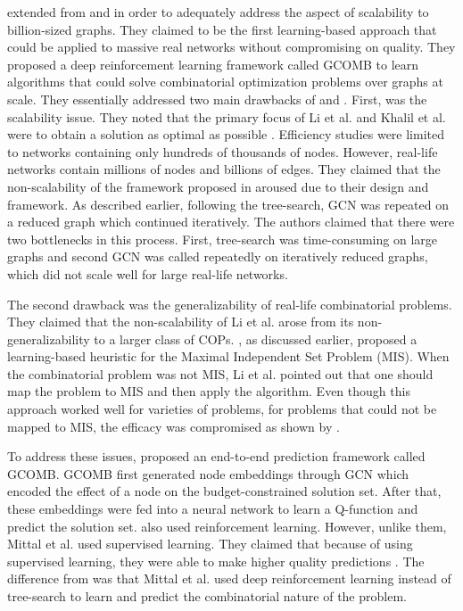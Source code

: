 \documentclass{article}
\begin{document}
\cite{mittal2019learning} extended from \cite{khalil2017learning} and \cite{li2018combinatorial} in order to adequately address the aspect of scalability to billion-sized graphs. They claimed to be the first learning-based approach that could be applied to massive real networks without compromising on quality. They proposed a deep reinforcement learning framework called GCOMB to learn algorithms that could solve combinatorial optimization problems over graphs at scale. They essentially addressed two main drawbacks of \cite{khalil2017learning} and \cite{li2018combinatorial}. First, was the scalability issue. They noted that the primary focus of Li et al. and Khalil et al. were to obtain a solution as optimal as possible \cite{mittal2019learning}. Efficiency studies were limited to networks containing only hundreds of thousands of nodes. However, real-life networks contain millions of nodes and billions of edges. They claimed that the non-scalability of the framework proposed in \cite{li2018combinatorial} aroused due to their design and framework. As described earlier, following the tree-search, GCN was repeated on a reduced graph which continued iteratively. The authors claimed that there were two bottlenecks in this process. First, tree-search was time-consuming on large graphs and second GCN was called repeatedly on iteratively reduced graphs, which did not scale well for large real-life networks. 

The second drawback was the generalizability of real-life combinatorial problems. They claimed that the non-scalability of Li et al. arose from its non-generalizability to a larger class of COPs. \cite{li2018combinatorial}, as discussed earlier, proposed a learning-based heuristic for the Maximal Independent Set Problem (MIS). When the combinatorial problem was not MIS, Li et al. pointed out that one should map the problem to MIS and then apply the algorithm. Even though this approach worked well for varieties of problems, for problems that could not be mapped to MIS, the efficacy was compromised as shown by \cite{mittal2019learning}.  

To address these issues, \cite{mittal2019learning} proposed an end-to-end prediction framework called GCOMB. GCOMB first generated node embeddings through GCN which encoded the effect of a node on the budget-constrained solution set. After that, these embeddings were fed into a neural network to learn a Q-function and predict the solution set. \cite{khalil2017learning} also used reinforcement learning. However, unlike them, Mittal et al. used supervised learning. They claimed that because of using supervised learning, they were able to make higher quality predictions \cite{mittal2019learning}. The difference from \cite{li2018combinatorial} was that Mittal et al. used deep reinforcement learning instead of tree-search to learn and predict the combinatorial nature of the problem.
\end{document}
